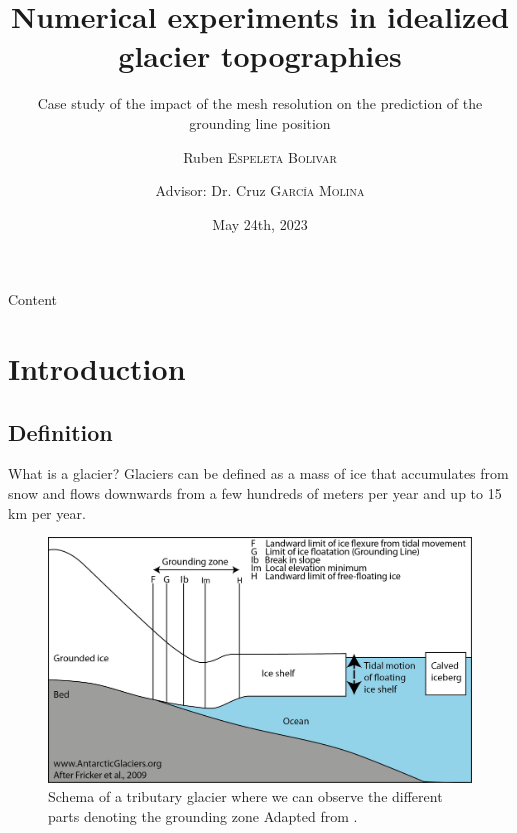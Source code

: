 \documentclass[11pt]{beamer}
\author{Ruben \textsc{Espeleta Bolivar} \\
	\and {Advisor: Dr. Cruz \textsc{García Molina}}}
\title[Numerical experiments]{Numerical experiments in idealized glacier topographies}
\date{May 24th, 2023}
\subtitle{Case study of the impact of the mesh resolution on the prediction of the grounding line position}
\institute[IGE]{
	\inst{1}
	Institut des geosciences de l'environnement
}
\begin{document}
	\begin{frame}
		\maketitle
	\end{frame}
	
	\begin{frame}{Content}
		\tableofcontents[hideallsubsections]
	\end{frame}
	
	\section{Introduction}
	\subsection{Definition}
		\begin{frame}{What is a glacier?}
		\justifying
		Glaciers can be defined as a mass of ice that accumulates from snow and flows downwards from a few hundreds of meters per year and up to 15 km per year.\pause
		\begin{figure}
		\centering
		\includegraphics[scale=0.4]{../fig/groundingzone.png}
		\caption{Schema of a tributary glacier where we can observe the different parts denoting the grounding zone Adapted from \cite{fricker2009mapping}. }
		\label{Glacier}
		\end{figure}
		\end{frame}
\end{document}
